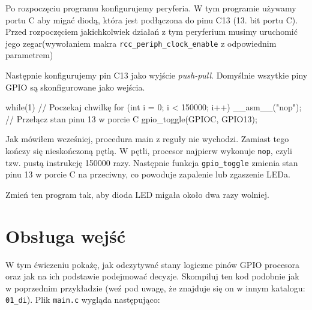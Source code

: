 \documentclass{pdfBooklets}
\begin{document}
Po rozpoczęciu programu konfigurujemy peryferia. W tym programie używamy portu C aby migać diodą, która jest podłączona do pinu C13
(13. bit portu C). Przed rozpoczęciem jakichkolwiek działań z tym peryferium musimy uruchomić jego zegar\footnotemark (wywołaniem makra
\Verb$rcc_periph_clock_enable$ z odpowiednim parametrem)

Następnie konfigurujemy pin C13 jako wyjście \textit{push-pull}. Domyślnie wszytkie piny GPIO są skonfigurowane jako wejścia.


\begin{CodeFrame*}[c]{}
  while(1){
    // Poczekaj chwilkę
    for (int i = 0; i < 150000; i++) __asm__("nop");
    // Przełącz stan pinu 13 w porcie C
    gpio_toggle(GPIOC, GPIO13); 
  }
\end{CodeFrame*}

Jak mówiłem wcześniej, procedura main z reguły nie wychodzi. Zamiast tego kończy się nieskończoną pętlą. W pętli, procesor najpierw
wykonuje \texttt{nop}, czyli tzw. pustą instrukcję 150000 razy\footnotemark. Następnie funkcja \Verb$gpio_toggle$ zmienia stan pinu 13
w porcie C na przeciwny, co powoduje zapalenie lub zgaszenie LEDa.

\begin{Zadanie}{}{}
  Zmień ten program tak, aby dioda LED migała około dwa razy wolniej.
\end{Zadanie}



\section{Obsługa wejść}
W tym ćwiczeniu pokażę, jak odczytywać stany logiczne pinów GPIO procesora oraz jak na ich podstawie podejmować
decyzje. Skompiluj ten kod podobnie jak w poprzednim przykładzie (weź pod uwagę, że znajduje się on w innym katalogu: \Verb$01_di$).
Plik \Verb$main.c$ wygląda następująco:
\end{document}
